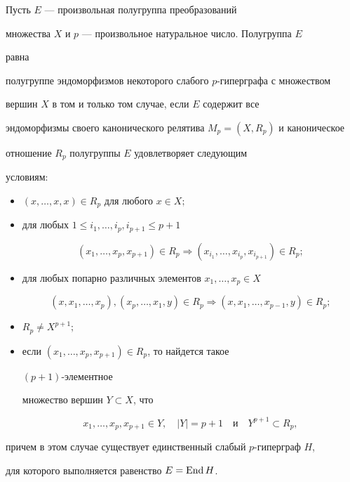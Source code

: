 \begin{thm} 


Пусть $E$ --- произвольная полугруппа преобразований 


множества $X$ и $p$ --- произвольное натуральное число. Полугруппа $E$ 


равна 


полугруппе эндоморфизмов некоторого слабого $p$-гиперграфа с множеством 


вершин $X$ в том и только том случае, если $E$ содержит все 


эндоморфизмы своего канонического релятива $M_p=(X,R_p)$ и каноническое 


отношение $R_p$ полугруппы $E$ удовлетворяет следующим 


условиям$:$ 


\begin{itemize} 


\item[$(T_1)$] $(x,\dotsc,x,x)\in R_p$ для любого $x\in X;$ 


\item[$(T_2)$] для любых $1\le i_1,\dotsc,i_p,i_{p+1}\le p+1$ 


$$ 


(x_1,\dotsc,x_p,x_{p+1})\in R_p\Longrightarrow 


(x_{i_1},\dotsc,x_{i_p},x_{i_{p+1}})\in R_p; 


$$ 


\item[$(T_3)$] 


для любых попарно различных элементов $x_1,\dotsc,x_p\in X$ 


$$ 


(x,x_1,\dotsc,x_p),(x_p,\dotsc,x_1,y)\in R_p\Longrightarrow 


(x,x_1,\dotsc,x_{p-1},y)\in R_p; 


$$ 


\item[$(T_4)$] $R_p\ne X^{p+1};$ 


\item[$(T_5)$] если $(x_1,\dotsc,x_p,x_{p+1})\in R_p$, то найдется такое 


$(p+1)$-элементное 


множество вершин $Y\subset X$, что 


$$ 


x_1,\dotsc,x_p,x_{p+1}\in Y,\quad |Y|=p+1\quad 


\text{и}\quad Y^{p+1}\subset R_p,


$$ 


\end{itemize} 


причем в этом случае существует единственный слабый $p$-гиперграф $H$, 


для которого выполняется равенство $E=\operatorname{End} H$. 


\end{thm} 


